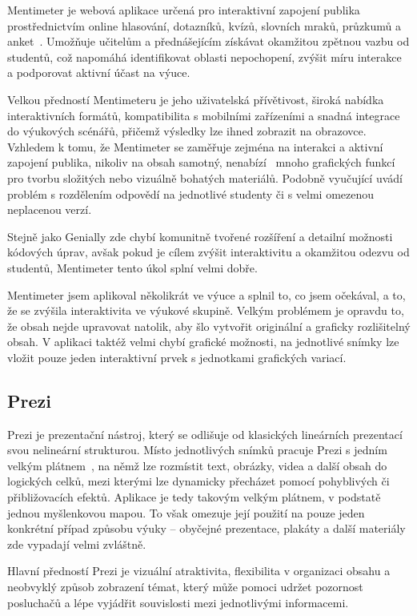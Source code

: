 Mentimeter je webová aplikace určená pro interaktivní zapojení publika prostřednictvím online hlasování, dotazníků, kvízů, slovních mraků, průzkumů a anket~\cite{mentimeter}. 
Umožňuje učitelům a přednášejícím získávat okamžitou zpětnou vazbu od studentů, což napomáhá identifikovat oblasti nepochopení, zvýšit míru interakce a podporovat aktivní účast na výuce. 

Velkou předností Mentimeteru je jeho uživatelská přívětivost, široká nabídka interaktivních formátů, kompatibilita s mobilními zařízeními a snadná integrace do výukových scénářů, přičemž výsledky lze ihned zobrazit na obrazovce. 
Vzhledem k tomu, že Mentimeter se zaměřuje zejména na interakci a aktivní zapojení publika, nikoliv na obsah samotný, nenabízí~\cite{mentimeter_review} mnoho grafických funkcí pro tvorbu složitých nebo vizuálně bohatých materiálů. 
Podobně vyučující uvádí problém s rozdělením odpovědí na jednotlivé studenty či s velmi omezenou neplacenou verzí.

Stejně jako Genially zde chybí komunitně tvořené rozšíření a detailní možnosti kódových úprav, avšak pokud je cílem zvýšit interaktivitu a okamžitou odezvu od studentů, Mentimeter tento úkol splní velmi dobře.

Mentimeter jsem aplikoval několikrát ve výuce a splnil to, co jsem očekával, a to, že se zvýšila interaktivita ve výukové skupině. 
Velkým problémem je opravdu to, že obsah nejde upravovat natolik, aby šlo vytvořit originální a graficky rozlišitelný obsah. 
V aplikaci taktéž velmi chybí grafické možnosti, na jednotlivé snímky lze vložit pouze jeden interaktivní prvek s jednotkami grafických variací.

\subsection{Prezi}

Prezi je prezentační nástroj, který se odlišuje od klasických lineárních prezentací svou nelineární strukturou.
Místo jednotlivých snímků pracuje Prezi s jedním velkým plátnem~\cite{prezi}, na němž lze rozmístit text, obrázky, videa a další obsah do logických celků, mezi kterými lze dynamicky přecházet pomocí pohyblivých či přibližovacích efektů.
Aplikace je tedy takovým velkým plátnem, v podstatě jednou myšlenkovou mapou.
To však omezuje její použití na pouze jeden konkrétní případ způsobu výuky -- obyčejné prezentace, plakáty a další materiály zde vypadají velmi zvláštně.

Hlavní předností Prezi je vizuální atraktivita, flexibilita v organizaci obsahu a neobvyklý způsob zobrazení témat, který může pomoci udržet pozornost posluchačů a lépe vyjádřit souvislosti mezi jednotlivými informacemi. 


